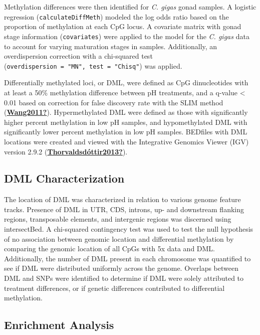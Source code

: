 \documentclass [11pt, proquest] {uwthesis}[2015/03/03]
\begin{document}
Methylation differences were then identified for \emph{C. gigas} gonad samples. A logistic regression (\texttt{calculateDiffMeth}) modeled the log odds ratio based on the proportion of methylation at each CpG locus. A covariate matrix with gonad stage information (\texttt{covariates}) were applied to the model for the \emph{C. gigas} data to account for varying maturation stages in samples. Additionally, an overdispersion correction with a chi-squared test (\texttt{overdispersion\ =\ "MN",\ test\ =\ "Chisq"}) was applied.

Differentially methylated loci, or DML, were defined as CpG dinucleotides with at least a 50\% methylation difference between pH treatments, and a q-value \textless{} 0.01 based on correction for false discovery rate with the SLIM method (\protect\hyperlink{ref-Wang2011}{\textbf{Wang2011?}}). Hypermethylated DML were defined as those with significantly higher percent methylation in low pH samples, and hypomethylated DML with significantly lower percent methylation in low pH samples. BEDfiles with DML locations were created and viewed with the Integrative Genomics Viewer (IGV) version 2.9.2 (\protect\hyperlink{ref-Thorvaldsduxf3ttir2013}{\textbf{Thorvaldsdóttir2013?}}).

\hypertarget{dml-characterization}{%
\subsection{DML Characterization}\label{dml-characterization}}

The location of DML was characterized in relation to various genome feature tracks. Presence of DML in UTR, CDS, introns, up- and downstream flanking regions, transposable elements, and intergenic regions was discerned using intersectBed. A chi-squared contingency test was used to test the null hypothesis of no association between genomic location and differential methylation by comparing the genomic location of all CpGs with 5x data and DML. Additionally, the number of DML present in each chromosome was quantified to see if DML were distributed uniformly across the genome. Overlaps between DML and SNPs were identified to determine if DML were solely attributed to treatment differences, or if genetic differences contributed to differential methylation.

\hypertarget{enrichment-analysis}{%
\subsection{Enrichment Analysis}\label{enrichment-analysis}}
\end{document}
